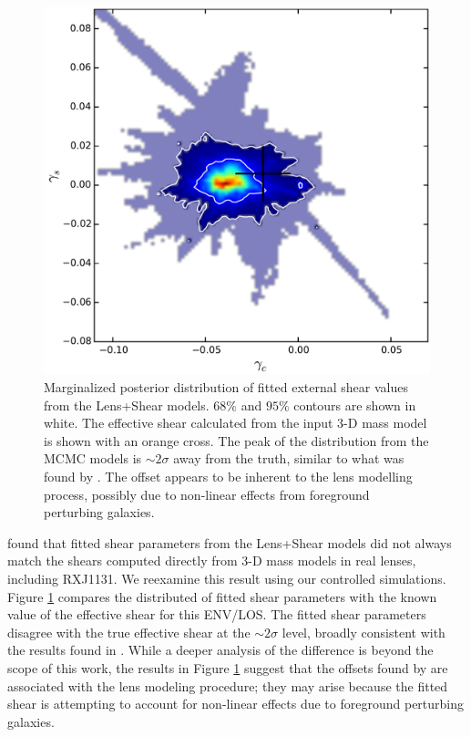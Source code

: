 \documentclass{emulateapj}
\begin{document}
\begin{figure}[ht]
\centering
\includegraphics[width=\columnwidth]{shear_offset.pdf}
\caption{Marginalized posterior distribution of fitted external shear values from the Lens+Shear models. $68\%$ and $95\%$ contours are shown in white. The effective shear calculated from the input 3-D mass model is shown with an orange cross. The peak of the distribution from the MCMC models is $\sim 2 \sigma$ away from the truth, similar to what was found by \citet{Wong11}. The offset appears to be inherent to the lens modelling process, possibly due to non-linear effects from foreground perturbing galaxies.}
\label{fig:shear_compare}
\end{figure}

\citet{Wong11} found that fitted shear parameters from the Lens+Shear models did not always match the shears computed directly from 3-D mass models in real lenses, including RXJ1131. We reexamine this result using our controlled simulations. Figure \ref{fig:shear_compare} compares the distributed of fitted shear parameters with the known value of the effective shear for this ENV/LOS. The fitted shear parameters disagree with the true effective shear at the $\sim 2\sigma$ level, broadly consistent with the results found in \citet{Wong11}. While a deeper analysis of the difference is beyond the scope of this work, the results in Figure \ref{fig:shear_compare} suggest that the offsets found by \citet{Wong11} are associated with the lens modeling procedure; they may arise because the fitted shear is attempting to account for non-linear effects due to foreground perturbing galaxies.
\end{document}
